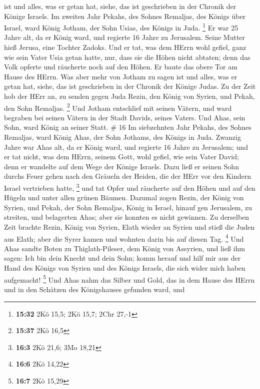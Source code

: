 ist und alles, was er getan hat, siehe, das ist geschrieben in der
Chronik der Könige Israels.  Im zweiten Jahr Pekahs, des
Sohnes Remaljas, des Königs über Israel, ward König Jotham, der Sohn
Usias, des Königs in Juda. \footnote{\textbf{15:32} 2Kö 15,5; 2Kö 15,7;
  2Chr 27,-1}  Er war 25 Jahre alt, da er König ward, und
regierte 16 Jahre zu Jerusalem. Seine Mutter hieß Jerusa, eine Tochter
Zadoks.  Und er tat, was dem HErrn wohl gefiel, ganz wie
sein Vater Usia getan hatte,  nur, dass sie die Höhen nicht
abtaten; denn das Volk opferte und räucherte noch auf den Höhen. Er
baute das obere Tor am Hause des HErrn.  Was aber mehr von
Jotham zu sagen ist und alles, was er getan hat, siehe, das ist
geschrieben in der Chronik der Könige Judas.  Zu der Zeit
hob der HErr an, zu senden gegen Juda Rezin, den König von Syrien, und
Pekah, den Sohn Remaljas. \footnote{\textbf{15:37} 2Kö 16,5}
 Und Jotham entschlief mit seinen Vätern, und ward begraben
bei seinen Vätern in der Stadt Davids, seines Vaters.  Und
Ahas, sein Sohn, ward König an seiner Statt. \# 16  Im
siebzehnten Jahr Pekahs, des Sohnes Remaljas, ward König Ahas, der Sohn
Jothams, des Königs in Juda.  Zwanzig Jahre war Ahas alt, da
er König ward, und regierte 16 Jahre zu Jerusalem; und er tat nicht, was
dem HErrn, seinem Gott, wohl gefiel, wie sein Vater David; 
denn er wandelte auf dem Wege der Könige Israels. Dazu ließ er seinen
Sohn durchs Feuer gehen nach den Gräueln der Heiden, die der HErr vor
den Kindern Israel vertrieben hatte, \footnote{\textbf{16:3} 2Kö 21,6;
  3Mo 18,21}  und tat Opfer und räucherte auf den Höhen und
auf den Hügeln und unter allen grünen Bäumen.  Dazumal zogen
Rezin, der König von Syrien, und Pekah, der Sohn Remaljas, König in
Israel, hinauf gen Jerusalem, zu streiten, und belagerten Ahas; aber sie
konnten es nicht gewinnen.  Zu derselben Zeit brachte Rezin,
König von Syrien, Elath wieder an Syrien und stieß die Juden aus Elath;
aber die Syrer kamen und wohnten darin bis auf diesen Tag. \footnote{\textbf{16:6}
  2Kö 14,22}  Und Ahas sandte Boten zu Thiglath-Pileser, dem
König von Assyrien, und ließ ihm sagen: Ich bin dein Knecht und dein
Sohn; komm herauf und hilf mir aus der Hand des Königs von Syrien und
des Königs Israels, die sich wider mich haben aufgemacht! \footnote{\textbf{16:7}
  2Kö 15,29}  Und Ahas nahm das Silber und Gold, das in dem
Hause des HErrn und in den Schätzen des Königshauses gefunden ward, und
